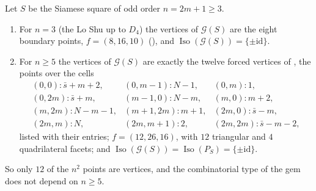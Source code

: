 \begin{theorem}
\label{thm:siamese}
Let $S$ be the Siamese square of odd order $n=2m+1\ge3$.
\begin{enumerate}
\item[(a)] For $n=3$ (the Lo Shu up to $D_4$) the vertices of $\mathcal G(S)$ are the eight boundary points, $f=(8,16,10)$ (), and $\operatorname{Iso}(\mathcal G(S))=\{\pm\mathrm{id}\}$.
\item[(b)] For $n\ge5$ the vertices of $\mathcal G(S)$ are exactly the twelve forced vertices of , the points over the cells
\[
\begin{array}{lll}
(0,0)\colon \bar s+m+2, & (0,m-1)\colon N-1, & (0,m)\colon 1, \\
(0,2m)\colon \bar s+m, & (m-1,0)\colon N-m, & (m,0)\colon m+2, \\
(m,2m)\colon N-m-1, & (m+1,2m)\colon m+1, & (2m,0)\colon \bar s-m, \\
(2m,m)\colon N, & (2m,m+1)\colon 2, & (2m,2m)\colon \bar s-m-2,
\end{array}
\]
listed with their entries; $f=(12,26,16)$, with $12$ triangular and $4$ quadrilateral facets; and $\operatorname{Iso}(\mathcal G(S))=\operatorname{Iso}(P_S)=\{\pm\mathrm{id}\}$.
\end{enumerate}
\end{theorem}

So only $12$ of the $n^2$ points are vertices, and the combinatorial type of the gem does not depend on $n\ge5$.

